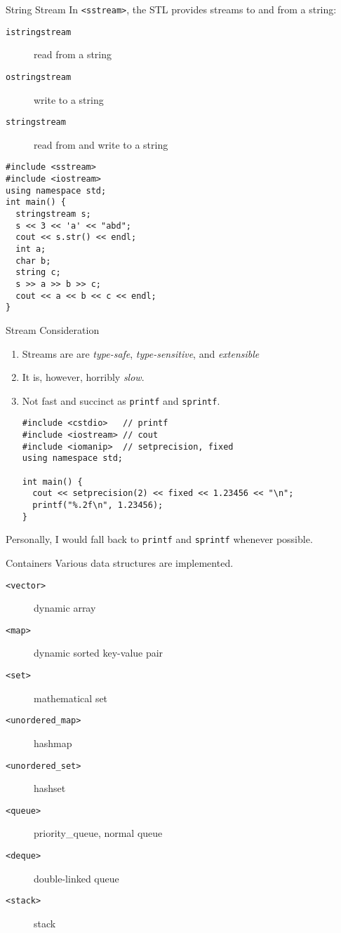 \documentclass[presentation]{beamer}
\begin{document}
\begin{frame}[fragile,label={sec:orgheadline71}]{String Stream}
 In \texttt{<sstream>}, the STL provides streams to and from a string:
\begin{description}
\item[{\texttt{istringstream}}] read from a string
\item[{\texttt{ostringstream}}] write to a string
\item[{\texttt{stringstream}}] read from and write to a string
\end{description}


\begin{verbatim}
#include <sstream>
#include <iostream>
using namespace std;
int main() {
  stringstream s;
  s << 3 << 'a' << "abd";
  cout << s.str() << endl;
  int a;
  char b;
  string c;
  s >> a >> b >> c;
  cout << a << b << c << endl;
}
\end{verbatim}
\end{frame}

\begin{frame}[fragile,label={sec:orgheadline72}]{Stream Consideration}
 \begin{enumerate}
\item Streams are are \emph{type-safe}, \emph{type-sensitive}, and \emph{extensible}
\item It is, however, horribly \emph{slow}.
\item Not fast and succinct as \texttt{printf} and \texttt{sprintf}.

\begin{verbatim}
#include <cstdio>   // printf
#include <iostream> // cout
#include <iomanip>  // setprecision, fixed
using namespace std;

int main() {
  cout << setprecision(2) << fixed << 1.23456 << "\n";
  printf("%.2f\n", 1.23456);
}
\end{verbatim}
\end{enumerate}


Personally, I would fall back to \texttt{printf} and \texttt{sprintf} whenever
possible.
\end{frame}

\begin{frame}[fragile,label={sec:orgheadline73}]{Containers}
 Various data structures are implemented.

\begin{description}
\item[{\texttt{<vector>}}] dynamic array
\item[{\texttt{<map>}}] dynamic sorted key-value pair
\item[{\texttt{<set>}}] mathematical set
\item[{\texttt{<unordered\_map>}}] hashmap
\item[{\texttt{<unordered\_set>}}] hashset
\item[{\texttt{<queue>}}] priority\_queue, normal queue
\item[{\texttt{<deque>}}] double-linked queue
\item[{\texttt{<stack>}}] stack
\end{description}
\end{frame}
\end{document}
